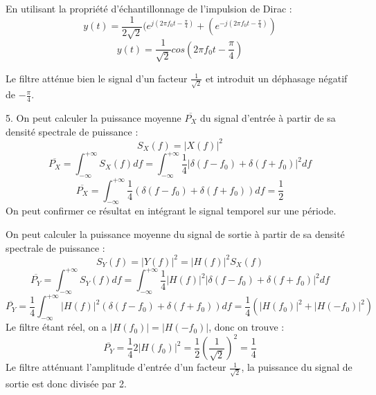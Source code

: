 \documentclass[11pt]{report}
\begin{document}
	En utilisant la propriété d'échantillonnage de l'impulsion de Dirac :
	\begin{equation*}
	y(t)=\frac{1}{2\sqrt{2}}(e^{j(2\pi f_{0}t-\frac{\pi}{4})}+(e^{-j(2\pi f_{0}t-\frac{\pi}{4})})
	\end{equation*}
	\begin{equation*}
	y(t)=\frac{1}{\sqrt{2}}cos(2\pi f_{0}t-\frac{\pi}{4})
	\end{equation*}
	
	Le filtre atténue bien le signal d'un facteur $\frac{1}{\sqrt{2}}$ et introduit un déphasage négatif de $-\frac{\pi}{4}$.
	
	\vspace{0.5\baselineskip}	
	
	5. On peut calculer la puissance moyenne $\overline{P_{X}}$ du signal d'entrée à partir de sa densité spectrale de puissance :
	\begin{equation*}
	S_{X}(f)=|X(f)|^{2}
	\end{equation*}
	\begin{equation*}
	\overline{P_{X}}=\int_{-\infty}^{+\infty}S_{X}(f)df=\int_{-\infty}^{+\infty}\frac{1}{4}|\delta(f-f_{0})+\delta(f+f_{0})|^{2}df
	\end{equation*}
	\begin{equation*}
	\overline{P_{X}}=\int_{-\infty}^{+\infty}\frac{1}{4}(\delta(f-f_{0})+\delta(f+f_{0}))df=\frac{1}{2}
	\end{equation*}
	On peut confirmer ce résultat en intégrant le signal temporel sur une période.
	
	On peut calculer la puissance moyenne du signal de sortie à partir de sa densité spectrale de puissance :
	\begin{equation*}
	S_{Y}(f)=|Y(f)|^{2}=|H(f)|^{2}S_{X}(f)
	\end{equation*}
	\begin{equation*}
	\overline{P_{Y}}=\int_{-\infty}^{+\infty}S_{Y}(f)df=\int_{-\infty}^{+\infty}\frac{1}{4}|H(f)|^{2}|\delta(f-f_{0})+\delta(f+f_{0})|^{2}df
	\end{equation*}
	\begin{equation*}
	\overline{P_{Y}}=\frac{1}{4}\int_{-\infty}^{+\infty}|H(f)|^{2}(\delta(f-f_{0})+\delta(f+f_{0}))df=\frac{1}{4}(|H(f_{0})|^{2}+|H(-f_{0})|^{2})
	\end{equation*}
	Le filtre étant réel, on a $|H(f_{0})|=|H(-f_{0})|$, donc on trouve : 
	\begin{equation*}
	\overline{P_{Y}}=\frac{1}{4}2|H(f_{0})|^{2}=\frac{1}{2}(\frac{1}{\sqrt{2}})^{2}=\frac{1}{4}
	\end{equation*}
	Le filtre atténuant l'amplitude d'entrée d'un facteur $\frac{1}{\sqrt{2}}$, la puissance du signal de sortie est donc divisée par 2.
	
	
	
		


	
	
	
	
	\vspace{1\baselineskip}	
	
	
	
	
\end{document}
